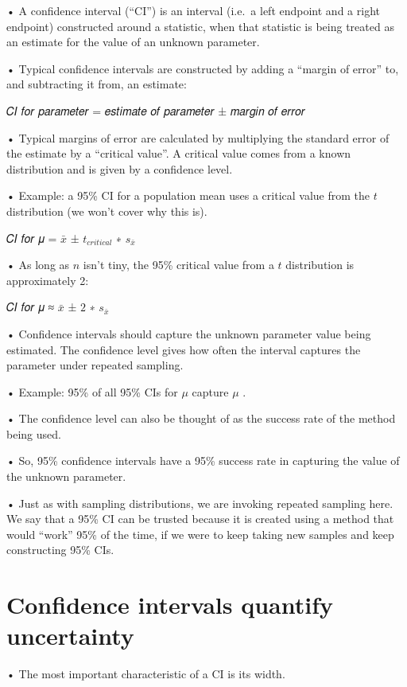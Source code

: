 \documentclass[
  letterpaper,
  DIV=11,
  numbers=noendperiod]{scrreprt}
\begin{document}
• A confidence interval (``CI'') is an interval (i.e.~a left endpoint
and a right endpoint) constructed around a statistic, when that
statistic is being treated as an estimate for the value of an unknown
parameter.

• Typical confidence intervals are constructed by adding a ``margin of
error'' to, and subtracting it from, an estimate:

𝐶𝐼 𝑓𝑜𝑟 𝑝𝑎𝑟𝑎𝑚𝑒𝑡𝑒𝑟 = 𝑒𝑠𝑡𝑖𝑚𝑎𝑡𝑒 𝑜𝑓 𝑝𝑎𝑟𝑎𝑚𝑒𝑡𝑒𝑟 ± 𝑚𝑎𝑟𝑔𝑖𝑛 𝑜𝑓 𝑒𝑟𝑟𝑜𝑟

• Typical margins of error are calculated by multiplying the standard
error of the estimate by a ``critical value''. A critical value comes
from a known distribution and is given by a confidence level.

• Example: a 95\% CI for a population mean uses a critical value from
the \(t\) distribution (we won't cover why this is).

𝐶𝐼 𝑓𝑜𝑟 𝜇 = \(\bar{x}\) ± \(𝑡_{𝑐𝑟𝑖𝑡𝑖𝑐𝑎𝑙}\) ∗ \(s_{\bar{x}}\)

• As long as \(n\) isn't tiny, the 95\% critical value from a \(t\)
distribution is approximately 2:

𝐶𝐼 𝑓𝑜𝑟 𝜇 ≈ \(\bar{x}\) ± \(2\) ∗ \(s_{\bar{x}}\)

• Confidence intervals should capture the unknown parameter value being
estimated. The confidence level gives how often the interval captures
the parameter under repeated sampling.

• Example: 95\% of all 95\% CIs for \(\mu\) capture \(\mu\) .

• The confidence level can also be thought of as the success rate of the
method being used.

• So, 95\% confidence intervals have a 95\% success rate in capturing
the value of the unknown parameter.

• Just as with sampling distributions, we are invoking repeated sampling
here. We say that a 95\% CI can be trusted because it is created using a
method that would ``work'' 95\% of the time, if we were to keep taking
new samples and keep constructing 95\% CIs.

\hypertarget{confidence-intervals-quantify-uncertainty}{%
\section{Confidence intervals quantify
uncertainty}\label{confidence-intervals-quantify-uncertainty}}

• The most important characteristic of a CI is its width.
\end{document}

